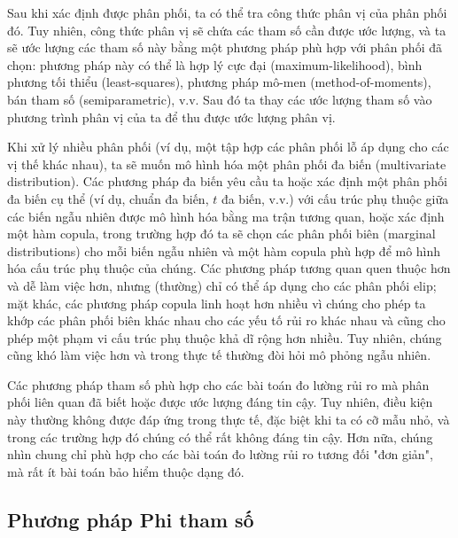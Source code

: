 Sau khi xác định được phân phối, ta có thể tra công thức phân vị của phân phối đó. Tuy nhiên, công thức phân vị sẽ chứa các tham số cần được ước lượng, và ta sẽ ước lượng các tham số này bằng một phương pháp phù hợp với phân phối đã chọn: phương pháp này có thể là hợp lý cực đại (maximum-likelihood), bình phương tối thiểu (least-squares), phương pháp mô-men (method-of-moments), bán tham số (semiparametric), v.v. Sau đó ta thay các ước lượng tham số vào phương trình phân vị của ta để thu được ước lượng phân vị.

Khi xử lý nhiều phân phối (ví dụ, một tập hợp các phân phối lỗ áp dụng cho các vị thế khác nhau), ta sẽ muốn mô hình hóa một phân phối đa biến (multivariate distribution). Các phương pháp đa biến yêu cầu ta hoặc xác định một phân phối đa biến cụ thể (ví dụ, chuẩn đa biến, $t$ đa biến, v.v.) với cấu trúc phụ thuộc giữa các biến ngẫu nhiên được mô hình hóa bằng ma trận tương quan, hoặc xác định một hàm copula, trong trường hợp đó ta sẽ chọn các phân phối biên (marginal distributions) cho mỗi biến ngẫu nhiên và một hàm copula phù hợp để mô hình hóa cấu trúc phụ thuộc của chúng. Các phương pháp tương quan quen thuộc hơn và dễ làm việc hơn, nhưng (thường) chỉ có thể áp dụng cho các phân phối elip; mặt khác, các phương pháp copula linh hoạt hơn nhiều vì chúng cho phép ta khớp các phân phối biên khác nhau cho các yếu tố rủi ro khác nhau và cũng cho phép một phạm vi cấu trúc phụ thuộc khả dĩ rộng hơn nhiều. Tuy nhiên, chúng cũng khó làm việc hơn và trong thực tế thường đòi hỏi mô phỏng ngẫu nhiên.

Các phương pháp tham số phù hợp cho các bài toán đo lường rủi ro mà phân phối liên quan đã biết hoặc được ước lượng đáng tin cậy. Tuy nhiên, điều kiện này thường không được đáp ứng trong thực tế, đặc biệt khi ta có cỡ mẫu nhỏ, và trong các trường hợp đó chúng có thể rất không đáng tin cậy. Hơn nữa, chúng nhìn chung chỉ phù hợp cho các bài toán đo lường rủi ro tương đối "đơn giản", mà rất ít bài toán bảo hiểm thuộc dạng đó.

\subsection{Phương pháp Phi tham số}

